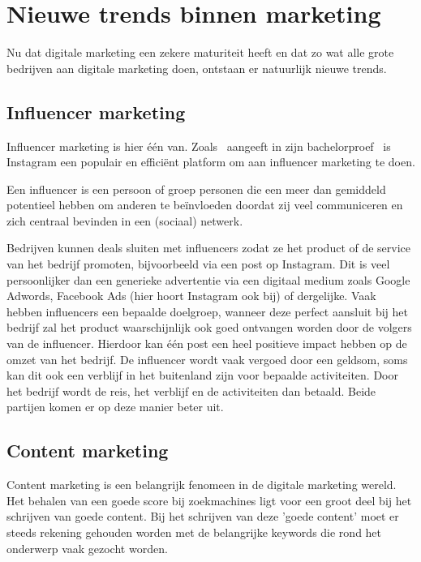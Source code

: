 \section{Nieuwe trends binnen marketing} \label{sec:nieuwe-trends-marketing}
Nu dat digitale marketing een zekere maturiteit heeft en dat zo wat alle grote bedrijven aan digitale marketing doen, ontstaan er natuurlijk nieuwe trends. 

\subsection{Influencer marketing} \label{sec:influencer-marketing}
Influencer marketing is hier één van. Zoals~\textcite{Pieters2018} aangeeft in zijn bachelorproef~ is Instagram een populair en efficiënt platform om aan influencer marketing te doen. 

Een influencer is een persoon of groep personen die een meer dan gemiddeld potentieel hebben om anderen te beïnvloeden doordat zij veel communiceren en zich centraal bevinden in een (sociaal) netwerk.~\autocite{Pieters2018}

Bedrijven kunnen deals sluiten met influencers zodat ze het product of de service van het bedrijf promoten, bijvoorbeeld via een post op Instagram. Dit is veel persoonlijker dan een generieke advertentie via een digitaal medium zoals Google Adwords, Facebook Ads (hier hoort Instagram ook bij) of dergelijke. Vaak hebben influencers een bepaalde doelgroep, wanneer deze perfect aansluit bij het bedrijf zal het product waarschijnlijk ook goed ontvangen worden door de volgers van de influencer. Hierdoor kan één post een heel positieve impact hebben op de omzet van het bedrijf. De influencer wordt vaak vergoed door een geldsom, soms kan dit ook een verblijf in het buitenland zijn voor bepaalde activiteiten. Door het bedrijf wordt de reis, het verblijf en de activiteiten dan betaald. Beide partijen komen er op deze manier beter uit.


\subsection{Content marketing} \label{sec:content-marketing}
Content marketing is een belangrijk fenomeen in de digitale marketing wereld. Het behalen van een goede score bij zoekmachines ligt voor een groot deel bij het schrijven van goede content. Bij het schrijven van deze 'goede content' moet er steeds rekening gehouden worden met de belangrijke keywords die rond het onderwerp vaak gezocht worden. 

